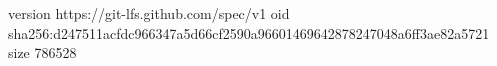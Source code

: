 version https://git-lfs.github.com/spec/v1
oid sha256:d247511acfdc966347a5d66cf2590a96601469642878247048a6ff3ae82a5721
size 786528
